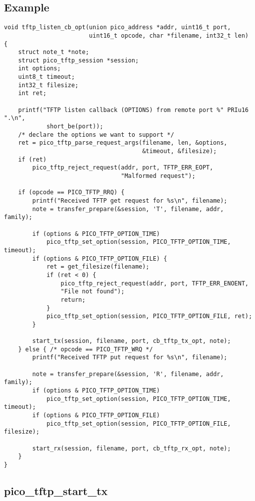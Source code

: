 \subsection*{Example}
\begin{verbatim}
void tftp_listen_cb_opt(union pico_address *addr, uint16_t port,
                        uint16_t opcode, char *filename, int32_t len)
{
    struct note_t *note;
    struct pico_tftp_session *session;
    int options;
    uint8_t timeout;
    int32_t filesize;
    int ret;

    printf("TFTP listen callback (OPTIONS) from remote port %" PRIu16 ".\n",
            short_be(port));
    /* declare the options we want to support */
    ret = pico_tftp_parse_request_args(filename, len, &options,
                                       &timeout, &filesize);
    if (ret)
        pico_tftp_reject_request(addr, port, TFTP_ERR_EOPT,
                                 "Malformed request");

    if (opcode == PICO_TFTP_RRQ) {
        printf("Received TFTP get request for %s\n", filename);
        note = transfer_prepare(&session, 'T', filename, addr, family);

        if (options & PICO_TFTP_OPTION_TIME)
            pico_tftp_set_option(session, PICO_TFTP_OPTION_TIME, timeout);
        if (options & PICO_TFTP_OPTION_FILE) {
            ret = get_filesize(filename);
            if (ret < 0) {
                pico_tftp_reject_request(addr, port, TFTP_ERR_ENOENT,
                "File not found");
                return;
            }
            pico_tftp_set_option(session, PICO_TFTP_OPTION_FILE, ret);
        }

        start_tx(session, filename, port, cb_tftp_tx_opt, note);
    } else { /* opcode == PICO_TFTP_WRQ */
        printf("Received TFTP put request for %s\n", filename);

        note = transfer_prepare(&session, 'R', filename, addr, family);
        if (options & PICO_TFTP_OPTION_TIME)
            pico_tftp_set_option(session, PICO_TFTP_OPTION_TIME, timeout);
        if (options & PICO_TFTP_OPTION_FILE)
            pico_tftp_set_option(session, PICO_TFTP_OPTION_FILE, filesize);

        start_rx(session, filename, port, cb_tftp_rx_opt, note);
    }
}
\end{verbatim}


\subsection{pico\_tftp\_start\_tx}

